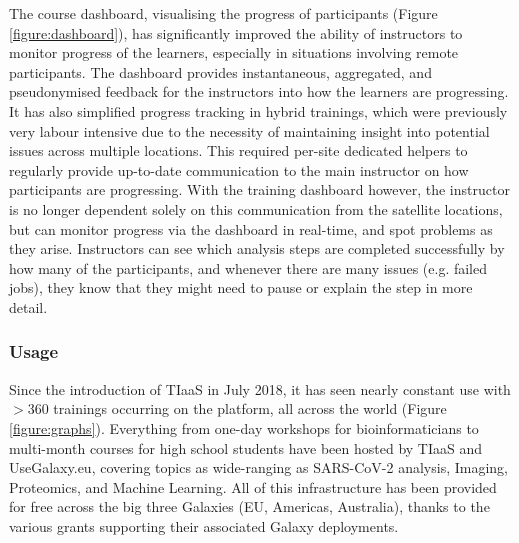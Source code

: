 \documentclass[a4paper,num-refs]{oup-contemporary}
\begin{document}
The course dashboard, visualising the progress of participants (Figure \ref{figure:dashboard}), has significantly improved the ability of instructors to monitor progress of the learners, especially in situations involving remote participants. The dashboard provides instantaneous, aggregated, and pseudonymised feedback for the instructors into how the learners are progressing. It has also simplified progress tracking in hybrid trainings, which were previously very labour intensive due to the necessity of maintaining insight into potential issues across multiple locations. This required per-site dedicated helpers to regularly provide up-to-date communication to the main instructor on how participants are progressing. With the training dashboard however, the instructor is no longer dependent solely on this communication from the satellite locations, but can monitor progress via the dashboard in real-time, and spot problems as they arise. Instructors can see which analysis steps are completed successfully by how many of the participants, and whenever there are many issues (e.g. failed jobs), they know that they might need to pause or explain the step in more detail.

\subsubsection{Usage}
Since the introduction of TIaaS in July 2018, it has seen nearly constant use with $>$360 trainings occurring on the platform, all across the world (Figure \ref{figure:graphs}).
Everything from one-day workshops for bioinformaticians to multi-month courses for high school students have been hosted by TIaaS and UseGalaxy.eu, covering topics as wide-ranging as SARS-CoV-2 analysis, Imaging, Proteomics, and Machine Learning. All of this infrastructure has been provided for free across the big three Galaxies (EU, Americas, Australia), thanks to the various grants supporting their associated Galaxy deployments.
\end{document}
